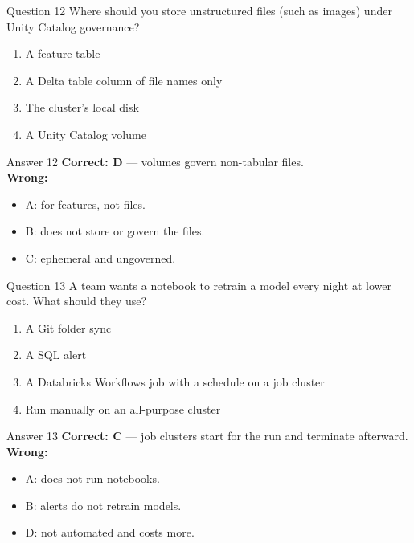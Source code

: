 \documentclass[aspectratio=169,11pt]{beamer}
\begin{document}
	\begin{frame}{Question 12}
		Where should you store unstructured files (such as images) under Unity Catalog governance?
		\begin{enumerate}[label=\Alph*.]
			\item A feature table
			\item A Delta table column of file names only
			\item The cluster's local disk
			\item A Unity Catalog volume
		\end{enumerate}
	\end{frame}
	\begin{frame}{Answer 12}
		\textbf{Correct: D} --- volumes govern non-tabular files.\\
		\vspace{0.5em}
		\textbf{Wrong:}
		\begin{itemize}
			\item A: for features, not files.
			\item B: does not store or govern the files.
			\item C: ephemeral and ungoverned.
		\end{itemize}
	\end{frame}
	
	\begin{frame}{Question 13}
		A team wants a notebook to retrain a model every night at lower cost. What should they use?
		\begin{enumerate}[label=\Alph*.]
			\item A Git folder sync
			\item A SQL alert
			\item A Databricks Workflows job with a schedule on a job cluster
			\item Run manually on an all-purpose cluster
		\end{enumerate}
	\end{frame}
	\begin{frame}{Answer 13}
		\textbf{Correct: C} --- job clusters start for the run and terminate afterward.\\
		\vspace{0.5em}
		\textbf{Wrong:}
		\begin{itemize}
			\item A: does not run notebooks.
			\item B: alerts do not retrain models.
			\item D: not automated and costs more.
		\end{itemize}
	\end{frame}
	
\end{document}
